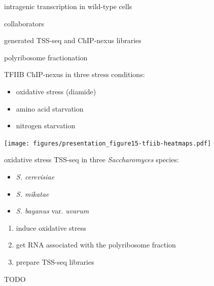 \documentclass[aspectratio=169]{beamer}
\begin{document}
\begin{frame}{intragenic transcription in wild-type cells}
\end{frame}

\begin{frame}{collaborators}
    \begin{description}[align=right, noitemsep]
        \item [Steve Doris] generated TSS-seq and ChIP-nexus libraries
        \item [Dan Spatt] polyribosome fractionation
    \end{description}
\end{frame}

\begin{frame}
    TFIIB ChIP-nexus in three stress conditions:
    \begin{itemize}
        \item oxidative stress (diamide)
        \item amino acid starvation
        \item nitrogen starvation
    \end{itemize}
\end{frame}

\begin{frame}
\texttt{[image: figures/presentation\_figure15-tfiib-heatmaps.pdf]}
\end{frame}

\begin{frame}
    oxidative stress TSS-seq in three \textit{Saccharomyces} species:
    \begin{itemize}
        \item \textit{S. cerevisiae}
        \item \textit{S. mikatae}
        \item \textit{S. bayanus} var. \textit{uvarum}
    \end{itemize}
\end{frame}

\begin{frame}
    \begin{enumerate}
        \item induce oxidative stress
        \item get RNA associated with the polyribosome fraction
        \item prepare TSS-seq libraries
    \end{enumerate}
\end{frame}

\begin{frame}
    TODO
\end{frame}
\end{document}
